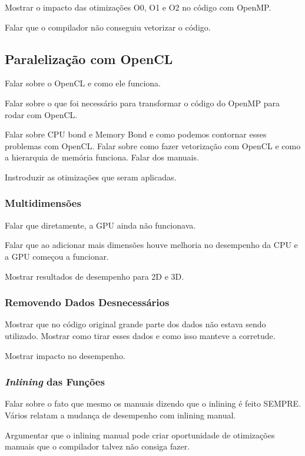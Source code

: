 \documentclass[paper=a4, fontsize=12pt]{scrartcl} %
\numberwithin{equation}{section} %
\numberwithin{figure}{section} %
\numberwithin{table}{section} %
\begin{document}
Mostrar o impacto das otimizações O0, O1 e O2 no código com OpenMP.

Falar que o compilador não conseguiu vetorizar o código.

\subsection{Paralelização com OpenCL}

Falar sobre o OpenCL e como ele funciona.

Falar sobre o que foi necessário para transformar o código do OpenMP para rodar com OpenCL.

Falar sobre CPU bond e Memory Bond e como podemos contornar esses problemas com OpenCL. Falar sobre como fazer vetorização com OpenCL e como a hierarquia de memória funciona. Falar dos manuais.

Instroduzir as otimizações que seram aplicadas.

\subsubsection{Multidimensões}

Falar que diretamente, a GPU ainda não funcionava. 

Falar que ao adicionar mais dimensões houve melhoria no desempenho da CPU e a GPU começou a funcionar. 

Mostrar resultados de desempenho para 2D e 3D.

\subsubsection{Removendo Dados Desnecessários}

Mostrar que no código original grande parte dos dados não estava sendo utilizado. Mostrar como tirar esses dados e como isso manteve a corretude.

Mostrar impacto no desempenho.

\subsubsection{\textit{Inlining} das Funções}

Falar sobre o fato que mesmo os manuais dizendo que o inlining é feito SEMPRE. Vários relatam a mudança de desempenho com inlining manual.

Argumentar que o inlining manual pode criar oportunidade de otimizações manuais que o compilador talvez não consiga fazer.
\end{document}
